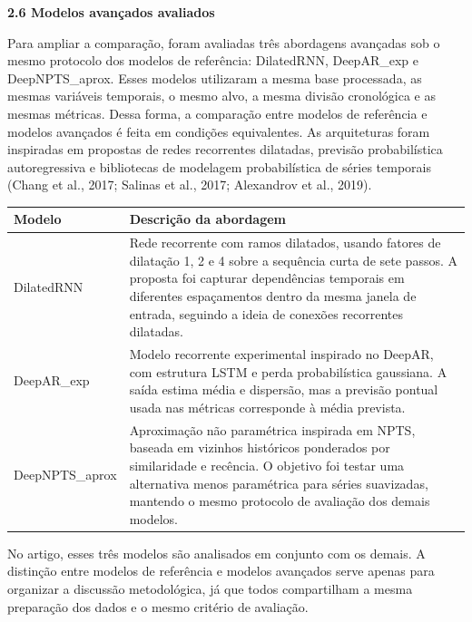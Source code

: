 \documentclass[12pt,a4paper]{article}
\begin{document}
\vspace{12pt}

\noindent\textbf{2.6 Modelos avançados avaliados}

Para ampliar a comparação, foram avaliadas três abordagens avançadas sob o mesmo protocolo dos modelos de referência: DilatedRNN, DeepAR\_exp e DeepNPTS\_aprox. Esses modelos utilizaram a mesma base processada, as mesmas variáveis temporais, o mesmo alvo, a mesma divisão cronológica e as mesmas métricas. Dessa forma, a comparação entre modelos de referência e modelos avançados é feita em condições equivalentes. As arquiteturas foram inspiradas em propostas de redes recorrentes dilatadas, previsão probabilística autoregressiva e bibliotecas de modelagem probabilística de séries temporais (Chang et al., 2017; Salinas et al., 2017; Alexandrov et al., 2019).

\vspace{6pt}

\begin{center}
\small
\begin{tabular}{p{2.8cm}p{10.0cm}}
\toprule
\textbf{Modelo} & \textbf{Descrição da abordagem} \\
\midrule
DilatedRNN & Rede recorrente com ramos dilatados, usando fatores de dilatação 1, 2 e 4 sobre a sequência curta de sete passos. A proposta foi capturar dependências temporais em diferentes espaçamentos dentro da mesma janela de entrada, seguindo a ideia de conexões recorrentes dilatadas. \\
DeepAR\_exp & Modelo recorrente experimental inspirado no DeepAR, com estrutura LSTM e perda probabilística gaussiana. A saída estima média e dispersão, mas a previsão pontual usada nas métricas corresponde à média prevista. \\
DeepNPTS\_aprox & Aproximação não paramétrica inspirada em NPTS, baseada em vizinhos históricos ponderados por similaridade e recência. O objetivo foi testar uma alternativa menos paramétrica para séries suavizadas, mantendo o mesmo protocolo de avaliação dos demais modelos. \\
\bottomrule
\end{tabular}
\end{center}

\vspace{6pt}

No artigo, esses três modelos são analisados em conjunto com os demais. A distinção entre modelos de referência e modelos avançados serve apenas para organizar a discussão metodológica, já que todos compartilham a mesma preparação dos dados e o mesmo critério de avaliação.
\end{document}
